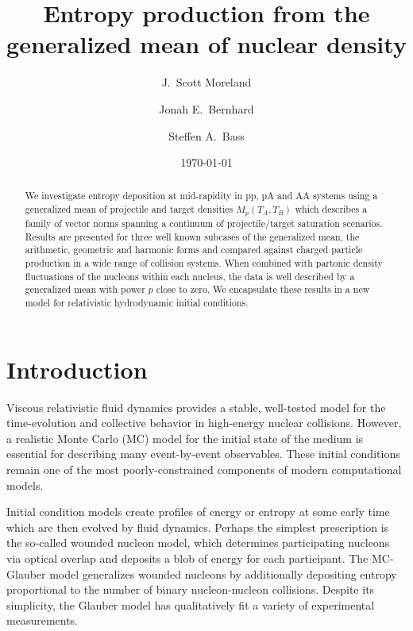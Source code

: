 \documentclass[aps,prl,reprint,amsmath,nofootinbib]{revtex4-1}
\begin{document}
\title{Entropy production from the generalized mean of nuclear density}

\author{J.\ Scott Moreland}
\author{Jonah E.\ Bernhard}
\author{Steffen A.\ Bass}

\date{\today}


\begin{abstract}
  We investigate entropy deposition at mid-rapidity in pp, pA and AA systems using a generalized mean of
  projectile and target densities $M_p(T_A,T_B)$ which describes a family of vector norms spanning a continuum
  of projectile/target saturation scenarios.  Results are presented for three well known subcases of the
  generalized mean, the arithmetic, geometric and harmonic forms and compared against charged particle
  production in a wide range of collision systems. When combined with partonic density fluctuations of the
  nucleons within each nucleus, the data is well described by a generalized mean with power $p$ close to zero.
  We encapsulate these results in a new model for relativistic hydrodynamic initial conditions.
\end{abstract}


\maketitle

\section{Introduction}

Viscous relativistic fluid dynamics provides a stable, well-tested model for the time-evolution and collective
behavior in high-energy nuclear collisions.  However, a realistic Monte Carlo (MC) model for the initial state
of the medium is essential for describing many event-by-event observables.  These initial conditions remain
one of the most poorly-constrained components of modern computational models.

Initial condition models create profiles of energy or entropy at some early time which are then evolved by
fluid dynamics.  Perhaps the simplest prescription is the so-called wounded nucleon model, which determines
participating nucleons via optical overlap and deposits a blob of energy for each participant.  The MC-Glauber
model generalizes wounded nucleons by additionally depositing entropy proportional to the number of binary
nucleon-nucleon collisions.  Despite its simplicity, the Glauber model has qualitatively fit a variety of
experimental measurements.
\end{document}
